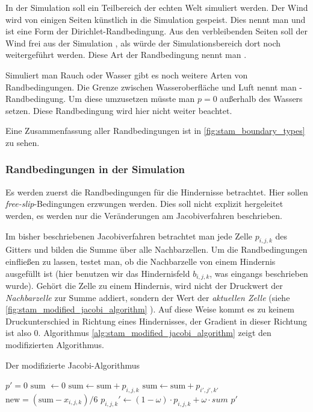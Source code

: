 In der Simulation soll ein Teilbereich der echten Welt simuliert werden. Der
Wind wird von einigen Seiten künstlich in die Simulation gespeist. Dies nennt
man  und ist eine Form der
Dirichlet-Randbedingung. Aus den verbleibenden Seiten soll der Wind frei aus der
Simulation , als würde der Simulationsbereich dort
noch weitergeführt werden. Diese Art der Randbedingung nennt man
.

Simuliert man Rauch oder Wasser gibt es noch weitere Arten von Randbedingungen.
Die Grenze zwischen Wasseroberfläche und Luft nennt man -Randbedingung. Um diese umzusetzen müsste man $p=0$ außerhalb
des Wassers setzen. Diese Randbedingung wird hier nicht weiter beachtet.

Eine Zusammenfassung aller Randbedingungen ist in \autoref{fig:stam_boundary_types} zu sehen.

\subsubsection{Randbedingungen in der Simulation}

Es werden zuerst die Randbedingungen für die Hindernisse betrachtet. Hier sollen
\emph{free-slip}-Bedingungen erzwungen werden. Dies soll nicht explizit
hergeleitet werden, es werden nur die Veränderungen am Jacobiverfahren
beschrieben.

Im bisher beschriebenen Jacobiverfahren betrachtet man jede Zelle $p_{i,j,k}$
des Gitters und bilden die Summe über alle Nachbarzellen. Um die Randbedingungen
einfließen zu lassen, testet man, ob die Nachbarzelle von einem Hindernis
ausgefüllt ist (hier benutzen wir das Hindernisfeld $b_{i,j,k}$, was eingangs
beschrieben wurde). Gehört die Zelle zu einem Hindernis, wird nicht der
Druckwert der \emph{Nachbarzelle} zur Summe addiert, sondern der Wert der
\emph{aktuellen Zelle} (siehe \autoref{fig:stam_modified_jacobi_algorithm}
). Auf
diese Weise kommt es zu keinem Druckunterschied in Richtung eines Hindernisses,
der Gradient in dieser Richtung ist also 0.  Algorithmus
\autoref{alg:stam_modified_jacobi_algorithm} zeigt den modifizierten
Algorithmus.

\begin{algorithm}
\caption{Der modifizierte Jacobi-Algorithmus}
\begin{algorithmic}
	\State $p' = 0$
		\State $\textrm{sum } \gets 0$
				\State $\textrm{sum} \gets \textrm{sum} + p_{i,j,k}$
			\Else
				\State $\textrm{sum} \gets \textrm{sum} + p_{i',j',k'}$
			\EndIf
		\EndFor
		\State $\textrm{new} = (\textrm{sum} - x_{i,j,k})/6$
		\State $p_{i,j,k}' \gets (1-\omega) \cdot p_{i,j,k} + \omega \cdot sum$
	\EndFor
	\State \Return $p'$
\EndFunction
\end{algorithmic}
\label{alg:stam_modified_jacobi_algorithm}
\end{algorithm}

